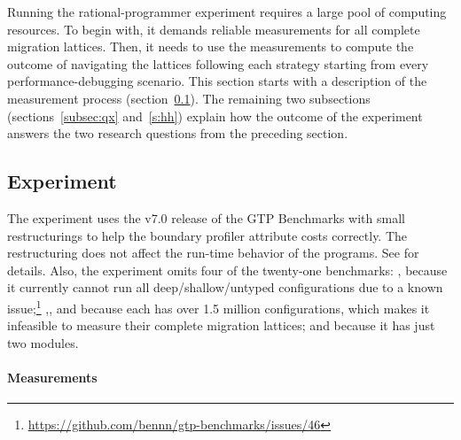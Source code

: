 \newcommand{\numgtp}{16}
\newcommand{\boundaryMB}{536} %
\newcommand{\statisticalMB}{4645} %
\newcommand{\runtimeMB}{44}

Running the rational-programmer experiment requires a large pool of
computing resources.  To begin with, it demands reliable measurements for
all complete migration lattices. Then, it needs to use the measurements to
compute the outcome of navigating the
lattices following each strategy starting from every performance-debugging
scenario. This section starts with a description of the measurement
process (section~\ref{subsec:experiment}). The remaining two subsections
(sections~\ref{subsec:qx} and~\ref{s:hh}) explain how the outcome of the
experiment answers the two research questions from the preceding
section.

\subsection{Experiment} \label{subsec:experiment} \label{sec:data}

The experiment uses the v7.0 release of the GTP Benchmarks
with small restructurings to help the boundary profiler attribute costs
correctly.
The restructuring does not affect the run-time behavior of the programs.
See 
for details.
Also, the experiment omits four of the twenty-one benchmarks:
, because it currently cannot run all deep/shallow/untyped
configurations due to a known issue;\footnote{
\url{https://github.com/bennn/gtp-benchmarks/issues/46}}
,, and  because each has over 1.5
million configurations, which makes it infeasible to measure their complete
migration lattices; and  because it has just two modules.

\paragraph{Measurements} 

